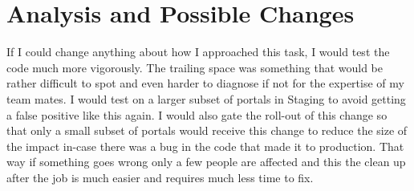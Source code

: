 \section{Analysis and Possible Changes}
If I could change anything about how I approached this task, I would test the code much more vigorously. The trailing space was something that would be rather difficult to spot and even harder to diagnose if not for the expertise of my team mates. I would test on a larger subset of portals in Staging to avoid getting a false positive like this again. \newline I would also gate the roll-out of this change so that only a small subset of portals would receive this change to reduce the size of the impact in-case there was a bug in the code that made it to production. That way if something goes wrong only a few people are affected and this the clean up after the job is much easier and requires much less time to fix. 